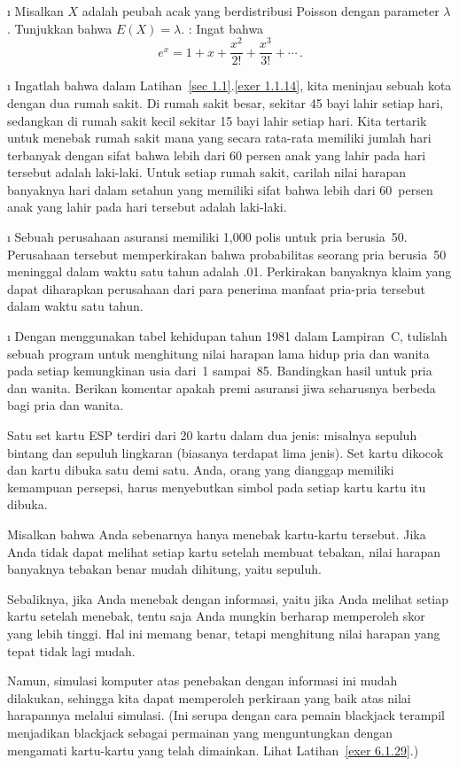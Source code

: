 \begin{LJSItem}
\begin{enumerate}
\end{enumerate}

\i\label{exer 6.1.100} Misalkan $X$ adalah peubah acak yang
berdistribusi Poisson dengan parameter $\lambda$. Tunjukkan bahwa $E(X) = \lambda$. :
Ingat bahwa
$$e^x = 1 + x + \frac{x^2}{2!} + \frac{x^3}{3!} + \cdots\,.$$

\i\label{exer 6.1.22} Ingatlah bahwa dalam Latihan~\ref{sec 1.1}.\ref{exer 1.1.14}, kita
meninjau sebuah kota dengan dua rumah sakit. Di rumah sakit besar, sekitar 45 bayi
lahir setiap hari, sedangkan di rumah sakit kecil sekitar 15 bayi lahir setiap hari. Kita
tertarik untuk menebak rumah sakit mana yang secara rata-rata memiliki jumlah hari terbanyak
dengan sifat bahwa lebih dari 60 persen anak yang lahir pada hari tersebut adalah
laki-laki. Untuk setiap rumah sakit, carilah nilai harapan banyaknya hari dalam setahun yang memiliki
sifat bahwa lebih dari 60~persen anak yang lahir pada hari tersebut adalah laki-laki.

\i\label{exer 6.1.23} Sebuah perusahaan asuransi memiliki 1{,}000 polis untuk pria berusia~50.
Perusahaan tersebut memperkirakan bahwa probabilitas seorang pria berusia~50 meninggal dalam waktu satu tahun adalah
.01. Perkirakan banyaknya klaim yang dapat diharapkan perusahaan dari para penerima manfaat pria-pria
tersebut dalam waktu satu tahun.

\i\label{exer 6.1.24} Dengan menggunakan tabel kehidupan tahun 1981 dalam Lampiran~C, tulislah
sebuah program untuk menghitung nilai harapan lama hidup pria dan wanita pada setiap kemungkinan usia
dari~1 sampai~85. Bandingkan hasil untuk pria dan wanita. Berikan komentar apakah premi asuransi
jiwa seharusnya berbeda bagi pria dan wanita.

\istar\label{exer 6.1.25} Satu set kartu ESP terdiri dari 20 kartu dalam dua jenis:
misalnya sepuluh bintang dan sepuluh lingkaran (biasanya terdapat lima jenis). Set kartu dikocok dan
kartu dibuka satu demi satu. Anda, orang yang dianggap memiliki kemampuan persepsi, harus menyebutkan
simbol pada setiap kartu  kartu itu dibuka.
\par
Misalkan bahwa Anda sebenarnya hanya menebak kartu-kartu tersebut. Jika Anda tidak dapat melihat
setiap kartu setelah membuat tebakan, nilai harapan banyaknya tebakan benar mudah
dihitung, yaitu sepuluh.
\par
Sebaliknya, jika Anda menebak dengan informasi, yaitu jika Anda melihat setiap
kartu setelah menebak, tentu saja Anda mungkin berharap memperoleh skor yang lebih tinggi. Hal ini
memang benar, tetapi menghitung nilai harapan yang tepat tidak lagi mudah.
\par
Namun, simulasi komputer atas penebakan dengan informasi ini mudah dilakukan, sehingga kita
dapat memperoleh perkiraan yang baik atas nilai harapannya melalui simulasi. (Ini serupa dengan cara
pemain blackjack terampil menjadikan blackjack sebagai permainan yang menguntungkan dengan mengamati
kartu-kartu yang telah dimainkan. Lihat Latihan~\ref{exer 6.1.29}.)


\end{LJSItem}
